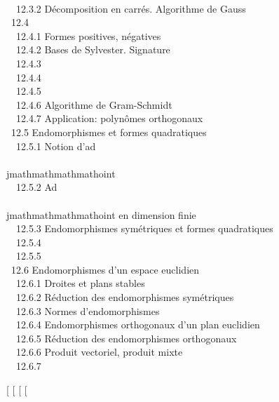 \\ ~~12.3.2 {Décomposition en
carrés. Algorithme de Gauss} \\ ~12.4
 \\
~~12.4.1 {Formes positives,
négatives} \\ ~~12.4.2 {Bases de
Sylvester. Signature} \\ ~~12.4.3
 \\ ~~12.4.4
 \\
~~12.4.5  \\
~~12.4.6 {Algorithme de
Gram-Schmidt} \\ ~~12.4.7
{Application: polynômes
orthogonaux} \\ ~12.5
{Endomorphismes et formes
quadratiques} \\ ~~12.5.1 {Notion
d'ad\\\\jmathmathmathmathoint} \\ ~~12.5.2 {Ad\\\\jmathmathmathmathoint
en dimension finie} \\ ~~12.5.3
{Endomorphismes symétriques et
formes quadratiques} \\ ~~12.5.4
 \\ ~~12.5.5
 \\ ~12.6
{Endomorphismes d'un espace
euclidien} \\ ~~12.6.1 {Droites
et plans stables} \\ ~~12.6.2
{Réduction des endomorphismes
symétriques} \\ ~~12.6.3 {Normes
d'endomorphismes} \\ ~~12.6.4
{Endomorphismes orthogonaux d'un
plan euclidien} \\ ~~12.6.5
{Réduction des endomorphismes
orthogonaux} \\ ~~12.6.6 {Produit
vectoriel, produit mixte} \\ ~~12.6.7


{[}
{[}
{[}
{[}

